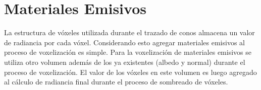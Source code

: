 \section{Materiales Emisivos} %
\label{sec:materiales_emisivos}
La estructura de vóxeles utilizada durante el trazado de conos almacena un valor de radiancia por cada vóxel. Considerando esto agregar materiales emisivos al proceso de voxelización es simple. Para la voxelización de materiales emisivos se utiliza otro volumen además de los ya existentes (albedo y normal) durante el proceso de voxelización. El valor de los vóxeles en este volumen es luego agregado al cálculo de radiancia final durante el proceso de sombreado de vóxeles.
